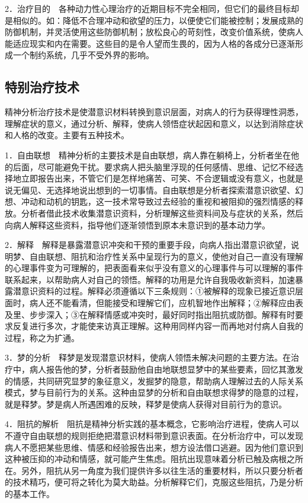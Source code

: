 2．治疗目的　各种动力性心理治疗的近期目标不完全相同，但它们的最终目标却是相似的。如：降低不合理冲动和欲望的压力，以便使它们能被控制；发展成熟的防御机制，并灵活使用这些防御机制；放松良心的苛刻性，改变价值系统，使病人能适应现实和内在需要。这些目的是令人望而生畏的，因为人格的各成分已逐渐形成一个制约系统，几乎不受外界的影响。

\subsection{特别治疗技术}

精神分析治疗技术是使潜意识材料转换到意识层面，对病人的行为获得理性洞悉，理解症状的意义，通过分析、解释，使病人领悟症状起因和意义，以达到消除症状和人格的改变。主要有五种技术。

1．自由联想　精神分析的主要技术是自由联想，病人靠在躺椅上，分析者坐在他的后面，尽可能避免干扰。要求病人把头脑里浮现的任何感情、思维、记忆不经选择地立即报告出来，不管它们是怎样地痛苦、可笑、不合逻辑或没有意义，也就是说无偏见、无选择地说出想到的一切事情。自由联想是分析者探索潜意识欲望、幻想、冲动和动机的钥匙，这一技术常导致过去经验的重视和被阻抑的强烈情感的释放。分析者借此技术收集潜意识资料，分析理解这些资料间及与症状的关系，然后向病人解释这些资料，指导他们逐渐领悟到原本未意识到的基本动力学。

2．解释　解释是暴露潜意识冲突和干预的重要手段，向病人指出潜意识欲望，说明梦、自由联想、阻抗和治疗性关系中呈现行为的意义，使他对自己一直没有理解的心理事件变为可理解的，把表面看来似乎没有意义的心理事件与可以理解的事件联系起来，以帮助病人对自己的领悟。解释的功用是允许自我吸收新资料，加速暴露潜意识资料的过程。解释必须遵循以下三条规则：①被解释的现象已接近意识层面时，病人还不能看清，但能接受和理解它们，应机智地作出解释；②解释应由表及里、步步深入；③在解释情感或冲突时，最好同时指出阻抗或防御。解释有时要求反复进行多次，才能使来访真正理解。这种用同样内容一而再地对付病人自我的过程，称之为扩通。

3．梦的分析　释梦是发现潜意识材料，使病人领悟未解决问题的主要方法。在治疗中，病人报告他的梦，分析者鼓励他自由地联想显梦中的某些要素，回忆其激发的情感，共同研究显梦的象征意义，发掘梦的隐意，帮助病人理解过去的人际关系模式，梦与目前行为的关系。这种由显梦的分析和自由联想求得梦的隐意的过程，就是释梦。梦是病人所遇困难的反映，释梦是使病人获得对目前行为的意识。

4．阻抗的解析　阻抗是精神分析实践的基本概念，它影响治疗进程，使病人可以不遵守自由联想的规则拒绝把潜意识材料带到意识表面。在分析治疗中，可以发现病人不愿把某些思维、情感和经验报告出来，想方设法借口逃避。因为他们意识到这种被压抑的冲动和情感，就可能产生焦虑。阻抗出现意味着分析已触及病根之所在。另外，阻抗从另一角度为我们提供许多以往生活的重要材料，所以只要分析者的技术精巧，便可将之转化为莫大助益。分析解释它们，克服这些阻抗，乃是分析的基本工作。


